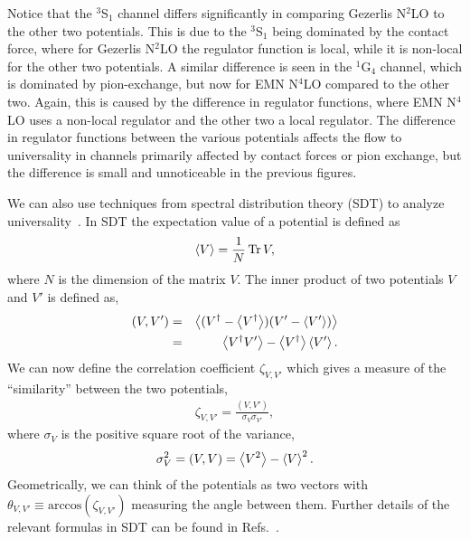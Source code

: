 \documentclass[10pt,aps,prc,floatfix,twocolumn,nofootinbib]{revtex4-1}
\begin{document}
Notice that the $^3$S$_1$ channel differs significantly in comparing Gezerlis N$^2$LO to the other two potentials.
This is due to the $^3$S$_1$ being dominated by the contact force, where for Gezerlis N$^2$LO the regulator function is local, while it is  non-local for the other two potentials.
A similar difference is seen in the $^1$G$_4$ channel, which is dominated by pion-exchange, but now for EMN N$^4$LO compared to the other two.
Again, this is caused by the difference in regulator functions, where EMN N$^4$LO uses a non-local regulator and the other two a local regulator.
The difference in regulator functions between the various potentials affects the flow to universality in channels primarily affected by contact forces or pion exchange, but the difference is small and unnoticeable in the previous figures.


We can also use techniques from spectral distribution theory (SDT) to analyze universality~\cite{Johnson:2017uor}.
In SDT the expectation value of a potential is defined as
%
\begin{eqnarray}
    \label{eq:sdt_exp_value}
    \expval{V} = \frac{1}{N} \Tr V,
\end{eqnarray}
%
where $N$ is the dimension of the matrix $V$.
The inner product of two potentials $V$ and $V'$ is defined as,
%
\begin{eqnarray}
    \label{eq:sdt_inner_product}
    (V,V') &=& \expval{(V^{\dagger}-\expval{V^{\dagger}})(V'-\expval{V'})} \nonumber \\
    &=& \expval{V^{\dagger} V'} - \expval{V^{\dagger}}\expval{V'}.
\end{eqnarray}
%
We can now define the correlation coefficient $\zeta_{V,V'}$ which gives a measure of the ``similarity'' between the two potentials,
%
\begin{eqnarray}
    \label{eq:sdt_corr_coeff}
    \zeta_{V,V'} = \frac{(V,V')}{\sigma_V \sigma_{V'}},
\end{eqnarray}
%
where $\sigma_V$ is the positive square root of the variance,
%
\begin{eqnarray}
    \label{eq:sdt_variance}
    \sigma^2_V = (V,V) = \expval{V^2} - \expval{V}^2.
\end{eqnarray}
%
Geometrically, we can think of the potentials as two vectors with $\theta_{V,V'} \equiv \textrm{arccos}(\zeta_{V,V'})$ measuring the angle between them.
Further details of the relevant formulas in SDT can be found in Refs.~\cite{Sviratcheva:2007bp,Launey:2013ysa}.
\end{document}
